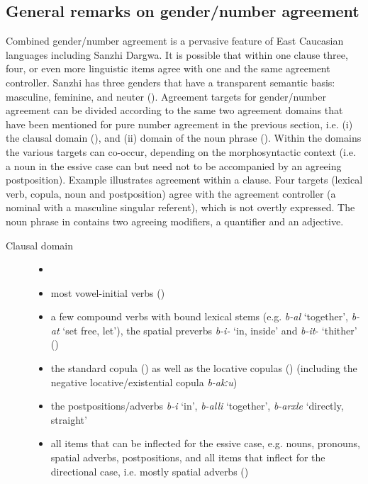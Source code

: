 \subsection{General remarks on gender/number agreement}
\label{General remarks on gender/number agreement} 
Combined gender/number agreement is a pervasive feature of East Caucasian languages including Sanzhi Dargwa. It is possible that within one clause three, four, or even more linguistic items agree with one and the same agreement controller. Sanzhi has three genders that have a transparent semantic basis: masculine, feminine, and neuter (). Agreement targets for gender/number agreement can be divided according to the same two agreement domains that have been mentioned for pure number agreement in the previous section, i.e. (i) the clausal domain (), and (ii) domain of the noun phrase (). Within the domains the various targets can co-occur, depending on the morphosyntactic context (i.e. a noun in the essive case can but need not to be accompanied by an agreeing postposition). Example  illustrates agreement within a clause. Four targets (lexical verb, copula, noun and postposition) agree with the agreement controller (a nominal with a masculine singular referent), which is not overtly expressed. The noun phrase in  contains two agreeing modifiers, a quantifier and an adjective.


\begin{description}
\item[Clausal domain]
\begin{itemize}[leftmargin=*]
    \item[]
	\item	most vowel-initial verbs ()
	\item a few compound verbs with bound lexical stems (e.g. \textit{b-al} ‘together', \textit{b-at} ‘set free, let'), the spatial preverbs \textit{b-i-} `in, inside' and \textit{b-it}- ‘thither' ()
	\item the standard copula () as well as the locative copulas () (including the negative locative/existential copula \textit{b-akːu})
	\item the postpositions/adverbs \textit{b-i} ‘in', \textit{b-alli} ‘together', \textit{b-arxle} ‘directly, straight'
	\item	all items that can be inflected for the essive case, e.g. nouns, pronouns, spatial adverbs, postpositions, and all items that inflect for the directional case, i.e. mostly spatial adverbs ()
\end{itemize}
\end{description}

